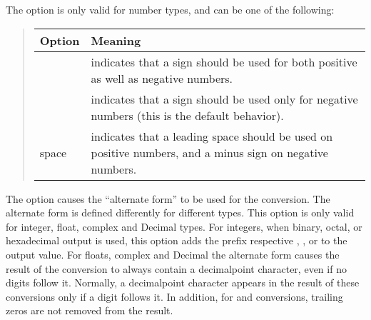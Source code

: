 \documentclass[letterpaper,10pt,english]{sphinxmanual}
\begin{document}
The  option is only valid for number types, and can be one of the
following:
\begin{quote}

\ignorespaces

\begin{savenotes}\sphinxattablestart
\centering
{}\label{\detokenize{string:index-4}}\nobreak
\begin{tabulary}{\linewidth}[t]{|T|T|}
\hline
\sphinxstyletheadfamily
Option
&\sphinxstyletheadfamily
Meaning
\\
\hline
\sphinxcode{\sphinxupquote{\textquotesingle{}+\textquotesingle{}}}
&
indicates that a sign should be used for both
positive as well as negative numbers.
\\
\hline
\sphinxcode{\sphinxupquote{\textquotesingle{}\sphinxhyphen{}\textquotesingle{}}}
&
indicates that a sign should be used only for negative
numbers (this is the default behavior).
\\
\hline
space
&
indicates that a leading space should be used on
positive numbers, and a minus sign on negative numbers.
\\
\hline
\end{tabulary}
\par
\sphinxattableend\end{savenotes}
\end{quote}

\ignorespaces
The \sphinxcode{\sphinxupquote{\textquotesingle{}\#\textquotesingle{}}} option causes the “alternate form” to be used for the
conversion.  The alternate form is defined differently for different
types.  This option is only valid for integer, float, complex and
Decimal types. For integers, when binary, octal, or hexadecimal output
is used, this option adds the prefix respective , , or
 to the output value. For floats, complex and Decimal the
alternate form causes the result of the conversion to always contain a
decimal\sphinxhyphen{}point character, even if no digits follow it. Normally, a
decimal\sphinxhyphen{}point character appears in the result of these conversions
only if a digit follows it. In addition, for  and 
conversions, trailing zeros are not removed from the result.
\end{document}
